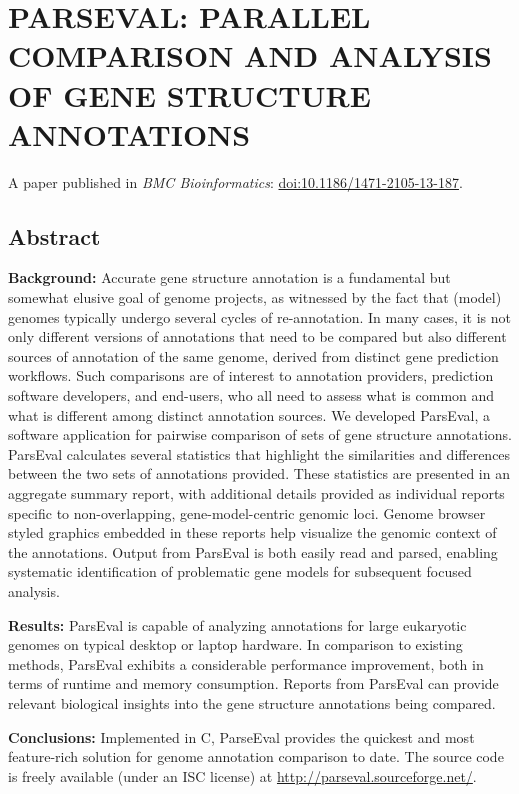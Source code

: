 \chapter{PARSEVAL: PARALLEL COMPARISON AND ANALYSIS OF GENE STRUCTURE ANNOTATIONS}

A paper published in \textit{BMC Bioinformatics}: \href{http://dx.doi.org/10.1186/1471-2105-13-187}{doi:10.1186/1471-2105-13-187}.

\section{Abstract}

\textbf{Background:} Accurate gene structure annotation is a fundamental but somewhat elusive goal of genome projects, as witnessed by the fact that (model) genomes typically undergo several cycles of re-annotation.
In many cases, it is not only different versions of annotations that need to be compared but also different sources of annotation of the same genome, derived from distinct gene prediction workflows.
Such comparisons are of interest to annotation providers, prediction software developers, and end-users, who all need to assess what is common and what is different among distinct annotation sources.
We developed ParsEval, a software application for pairwise comparison of sets of gene structure annotations.
ParsEval calculates several statistics that highlight the similarities and differences between the two sets of annotations provided.
These statistics are presented in an aggregate summary report, with additional details provided as individual reports specific to non-overlapping, gene-model-centric genomic loci.
Genome browser styled graphics embedded in these reports help visualize the genomic context of the annotations.
Output from ParsEval is both easily read and parsed, enabling systematic identification of problematic gene models for subsequent focused analysis.

\textbf{Results:} ParsEval is capable of analyzing annotations for large eukaryotic genomes on typical desktop or laptop hardware.
In comparison to existing methods, ParsEval exhibits a considerable performance improvement, both in terms of runtime and memory consumption.
Reports from ParsEval can provide relevant biological insights into the gene structure annotations being compared.

\textbf{Conclusions:} Implemented in C, ParseEval provides the quickest and most feature-rich solution for genome annotation comparison
to date.
The source code is freely available (under an ISC license) at \url{http://parseval.sourceforge.net/}.

